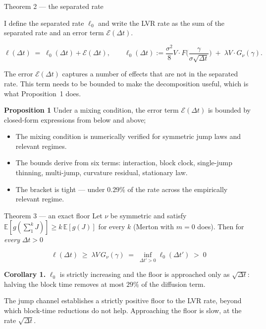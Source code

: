 \documentclass[10pt,xcolor=x11names,aspectratio=169]{beamer}
\newcommand{\dt}{\Delta t}
\newcommand{\E}{\mathbb{E}}
\newcommand{\1}{\mathbf{1}}
\begin{document}
\begin{frame}{Theorem 2 --- the separated rate}

  I define the separated rate $\ell_0$ and write the LVR rate as the sum of 
  the separated rate and an error term $\mathcal{E}(\dt)$.

  \begin{block}{}
    \[
      \ell(\dt) \;=\; \ell_0(\dt) + \mathcal{E}(\dt),
      \qquad
      \ell_0(\dt) := \frac{\sigma^2}{8}V\cdot F\!\Big(\frac{\gamma}{\sigma\sqrt{\dt}}\Big)
      \;+\; \lambda V \cdot G_\nu(\gamma).
    \]
  \end{block}
  \medskip

  The error $\mathcal{E}(\dt)$ captures a number of effects that are not in the separated rate.
  This term needs to be bounded to make the decomposition useful, which is what Proposition~1 does.
  \medskip

  \textbf{Proposition 1} Under a mixing condition, the error term $\mathcal{E}(\dt)$ is bounded by
  closed-form expressions from below and above; 
  \begin{itemize}
    \item The mixing condition is numerically verified for symmetric jump laws and relevant regimes.
    \item The bounds derive from six terms: interaction, block clock, single-jump thinning,
          multi-jump, curvature residual, stationary law.
    \item The bracket is tight --- under $0.29\%$ of the rate
          across the empirically relevant regime.
  \end{itemize}
\end{frame}

\begin{frame}{Theorem 3 --- an exact floor}
  Let $\nu$ be symmetric and satisfy $\E[g(\sum_1^k J)] \ge k\,\E[g(J)]$ for
  every $k$ (Merton with $m=0$ does). Then for \emph{every} $\dt>0$
  \medskip
  
  \begin{block}{}
    \[
      \ell(\dt)\;\ge\;\lambda V\,G_\nu(\gamma)\;=\;\inf_{\dt'>0}\ell_0(\dt')\;>\;0
    \]
  \end{block}
  \medskip

  \textbf{Corollary 1.} $\ell_0$ is strictly increasing and the floor is
          approached only as $\sqrt{\dt}$: halving the block time removes at
          most $29\%$ of the diffusion term.
  \medskip

  \begin{takeaway}
    The jump channel establishes a strictly positive floor to the LVR rate, beyond 
    which block-time reductions do not help. Approaching the floor is slow, at the 
    rate $\sqrt{\dt}$.
  \end{takeaway}
\end{frame}
\end{document}
